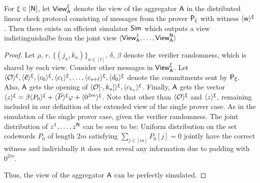 \begin{lemma}\label{lem:distlincheckzk}
	For $\xi\in [\mathsf{N}]$, let $\mathsf{View}^\xi_{\mathsf{A}}$ denote the view of the aggregator $\mathsf{A}$ in the distributed
	linear check protocol consisting of messages from the prover $\mathsf{P}_\xi$ with
	witness $\langle{\mathsf{w}}\rangle^\xi$. Then there exists an efficient simulator $\mathsf{Sim}$
	which outputs a view indistinguishalbe from the joint view $\langle
	\mathsf{View}^1_{\mathsf{A}},\ldots,\mathsf{View}^{\mathsf{N}}_{\mathsf{A}}\rangle$ 
\end{lemma}
\begin{proof}
	
	Let  $\rho, \, r, \, \{(j_u,k_u)\}_{u\in[t]}, \, \delta, \, \beta$ denote the verifier
	randomness, which is shared by each view. Consider other messages in
	$\mathsf{View}^\xi_{\mathsf{A}}$. Let $\langle{\mathcal{O}}\rangle^\xi, \langle{\bm{\tilde{c}}}\rangle^\xi, \langle{c_0}\rangle^\xi, \langle{c_1}\rangle^\xi, \ldots, \langle{c_{s+\ell}}\rangle^\xi, \langle{d_0}\rangle^\xi$ 
	denote the commitments sent by $\mathsf{P}_\xi$. Also, $\mathsf{A}$ gets the opening of $\langle{\mathcal{O}[\cdot,k_u]}\rangle^\xi, \langle{c_{k_u}}\rangle^\xi$.
	Finally, $\mathsf{A}$ gets the vector $\langle{z}\rangle^\xi = \beta\langle{P_0}\rangle^\xi + \langle{\overline{P}}\rangle^\xi\varphi + \langle{0^{2m}}\rangle^\xi$.
	Note that other than $\langle{\mathcal{O}}\rangle^\xi$ and $\langle{z}\rangle^\xi$, remaining
	included in our definition of the extended view of the single prover case. As in the simulation of the
	single prover case, given the verifier randomness. The joint distribution of ${z}^1,\ldots,{z}^{\mathsf{N}}$ can be seen to be:
		Uniform distribution on the set codewords $P_0$ of length $2m$ satisfying
		$\sum_{j\in [m]}P_0[j]=0$ 
		jointly have the correct witness and individually it does not reveal any information due to padding with $0^{2m}$.
	
	Thus, the view of the aggregator $\mathsf{A}$ can be perfectly simulated.
\end{proof}

